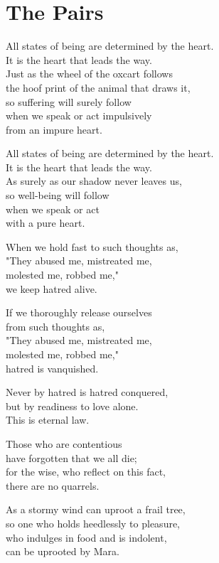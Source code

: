
\chapter{The Pairs}

All states of being are determined by the heart.\\
It is the heart that leads the way.\\
Just as the wheel of the oxcart follows\\
the hoof print of the animal that draws it,\\
so suffering will surely follow\\
when we speak or act impulsively\\
from an impure heart.


All states of being are determined by the heart.\\
It is the heart that leads the way.\\
As surely as our shadow never leaves us,\\
so well-being will follow\\
when we speak or act\\
with a pure heart.


When we hold fast to such thoughts as,\\
"They abused me, mistreated me,\\
molested me, robbed me,"\\
we keep hatred alive.


If we thoroughly release ourselves\\
from such thoughts as,\\
"They abused me, mistreated me,\\
molested me, robbed me,"\\
hatred is vanquished.


Never by hatred is hatred conquered,\\
but by readiness to love alone.\\
This is eternal law.



Those who are contentious\\
have forgotten that we all die;\\
for the wise, who reflect on this fact,\\
there are no quarrels.


As a stormy wind can uproot a frail tree,\\
so one who holds heedlessly to pleasure,\\
who indulges in food and is indolent,\\
can be uprooted by Mara.


